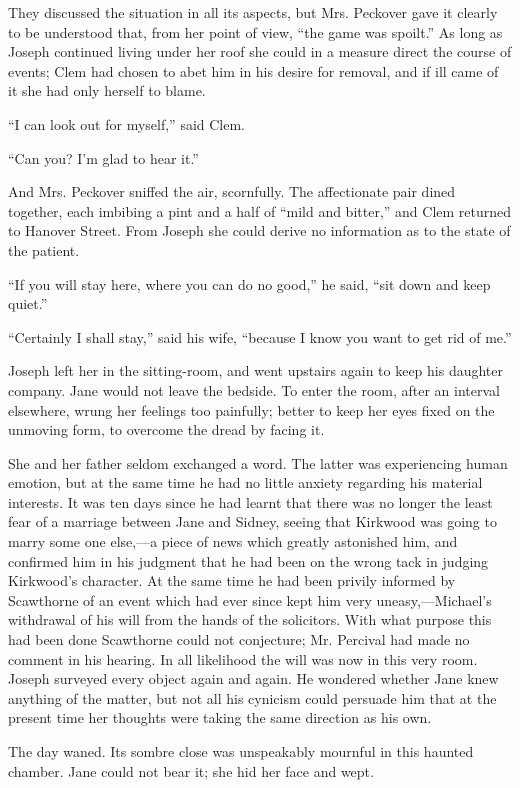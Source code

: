 They discussed the situation in all its {}aspects, but Mrs. Peckover
gave it clearly to be understood that, from her point of view, ``the
game was spoilt.'' As long as Joseph continued living under her roof she
could in a measure direct the course of events; Clem had chosen to abet
him in his desire for removal, and if ill came of it she had only
herself to blame.

``I can look out for myself,'' said Clem.

``Can you? I'm glad to hear it.''

And Mrs. Peckover sniffed the air, scornfully. The affectionate pair
dined together, each imbibing a pint and a half of ``mild and bitter,''
and Clem returned to Hanover Street. From Joseph she could derive no
information as to the state of the patient.

``If you will stay here, where you can do no good,'' he said, ``sit down
and keep quiet.''

``Certainly I shall stay,'' said his wife, ``because I know you want to
get rid of me.''

Joseph left her in the sitting-room, and went upstairs again to keep his
daughter company. Jane would not leave the bedside. To enter the room,
after an interval elsewhere, wrung her feelings too painfully; better to
keep her eyes fixed on the unmoving form, to overcome the dread by
facing it.

{}She and her father seldom exchanged a word. The latter was
experiencing human emotion, but at the same time he had no little
anxiety regarding his material interests. It was ten days since he had
learnt that there was no longer the least fear of a marriage between
Jane and Sidney, seeing that Kirkwood was going to marry some one
else,---a piece of news which greatly astonished him, and confirmed him
in his judgment that he had been on the wrong tack in judging Kirkwood's
character. At the same time he had been privily informed by Scawthorne
of an event which had ever since kept him very uneasy,---Michael's
withdrawal of his will from the hands of the solicitors. With what
purpose this had been done Scawthorne could not conjecture; Mr. Percival
had made no comment in his hearing. In all likelihood the will was now
in this very room. Joseph surveyed every object again and again. He
wondered whether Jane knew anything of the matter, but not all his
cynicism could persuade him that at the present time her thoughts were
taking the same direction as his own.

The day waned. Its sombre close was {}unspeakably mournful in this
haunted chamber. Jane could not bear it; she hid her face and wept.


